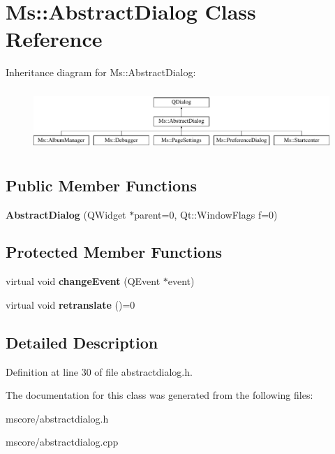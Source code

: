 \hypertarget{class_ms_1_1_abstract_dialog}{}\section{Ms\+:\+:Abstract\+Dialog Class Reference}
\label{class_ms_1_1_abstract_dialog}
Inheritance diagram for Ms\+:\+:Abstract\+Dialog\+:\begin{figure}[H]
\begin{center}
\leavevmode
\includegraphics[height=2.349650cm]{class_ms_1_1_abstract_dialog}
\end{center}
\end{figure}
\subsection*{Public Member Functions}
\begin{DoxyCompactItemize}
\item 
\mbox{\label{class_ms_1_1_abstract_dialog_af8fab1deef53ce82b8230e0c11c36ff9}} 
{\bfseries Abstract\+Dialog} (Q\+Widget $\ast$parent=0, Qt\+::\+Window\+Flags f=0)
\end{DoxyCompactItemize}
\subsection*{Protected Member Functions}
\begin{DoxyCompactItemize}
\item 
\mbox{\label{class_ms_1_1_abstract_dialog_a8b3a49dc3c7531f0a3234078b3aa97e1}} 
virtual void {\bfseries change\+Event} (Q\+Event $\ast$event)
\item 
\mbox{\label{class_ms_1_1_abstract_dialog_ab3e5ad9b82fa50484aeae4873cd7c850}} 
virtual void {\bfseries retranslate} ()=0
\end{DoxyCompactItemize}


\subsection{Detailed Description}


Definition at line 30 of file abstractdialog.\+h.



The documentation for this class was generated from the following files\+:\begin{DoxyCompactItemize}
\item 
mscore/abstractdialog.\+h\item 
mscore/abstractdialog.\+cpp\end{DoxyCompactItemize}
